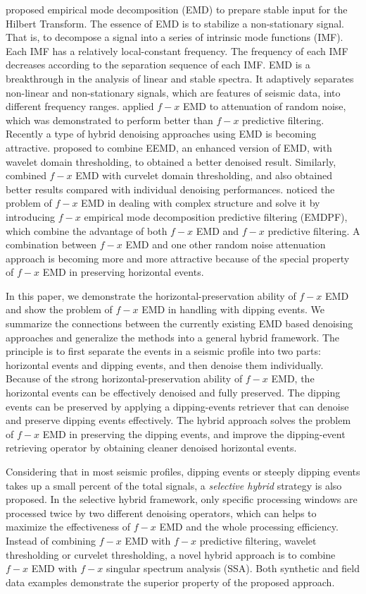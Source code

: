 \cite{emd} proposed empirical mode decomposition (EMD) to prepare stable input for the Hilbert Transform. 
The essence of EMD is to stabilize a non-stationary signal. That is, to decompose a signal into a series of intrinsic mode functions (IMF). Each IMF has a relatively local-constant frequency. The frequency of each IMF decreases according to the separation sequence of each IMF.  EMD is a breakthrough in the analysis of linear and stable spectra. It adaptively separates non-linear and non-stationary signals, which are features of seismic data, into different frequency ranges. \cite{bekara} applied $f-x$ EMD to attenuation of random noise, which was demonstrated to perform better than $f-x$ predictive filtering.  Recently a type of hybrid denoising approaches using EMD is becoming attractive. \cite{chenwei2012} proposed to combine  EEMD, an enhanced version of EMD, with wavelet domain thresholding, to obtained a better denoised result. Similarly, \cite{lieqian2013} combined $f-x$ EMD with curvelet domain thresholding, and also obtained better results compared with individual denoising performances. \cite{yangkang20132} noticed the problem of $f-x$ EMD in dealing with complex structure and solve it by introducing $f-x$ empirical mode decomposition predictive filtering (EMDPF), which combine the advantage of both $f-x$ EMD and $f-x$ predictive filtering.  A combination between $f-x$ EMD and one other random noise attenuation approach is becoming more and more attractive because of the special property of $f-x$ EMD in preserving horizontal events.

In this paper, we demonstrate the horizontal-preservation ability of $f-x$ EMD and show the problem of $f-x$ EMD in handling with dipping events. We summarize the connections between the currently existing EMD based denoising approaches and generalize the methods into a general hybrid framework. The principle is to first separate the events in a seismic profile into two parts: horizontal events and dipping events, and then denoise them individually. Because of the strong horizontal-preservation ability of $f-x$ EMD, the horizontal events can be effectively denoised and fully preserved. The dipping events can be preserved by applying a dipping-events retriever that can denoise and preserve dipping events effectively. The hybrid approach solves the problem of $f-x$ EMD in preserving the dipping events, and improve the dipping-event retrieving operator by obtaining cleaner denoised horizontal events. 

Considering that in most seismic profiles, dipping events or steeply dipping events takes up a small percent of the total signals, a \textit{selective hybrid} strategy is also proposed. In the selective hybrid framework, only specific processing windows are processed twice by two different denoising operators, which can helps to maximize the effectiveness of $f-x$ EMD and the whole processing efficiency. Instead of combining $f-x$ EMD with $f-x$ predictive filtering, wavelet thresholding or curvelet thresholding, a novel hybrid approach is to combine $f-x$ EMD with $f-x$ singular spectrum analysis (SSA). Both synthetic and field data examples demonstrate the superior property of the proposed approach.

